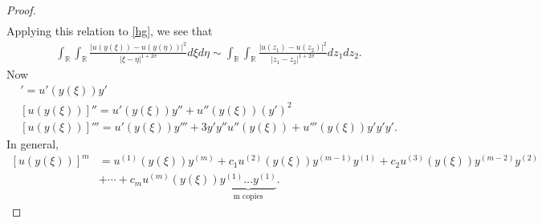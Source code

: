 \documentclass[12pt,reqno]{amsart}
\numberwithin{equation}{section}  %
\numberwithin{figure}{section}
\newcommand{\rr}{\mathbb{R}}
\begin{document}
\begin{proof}
\begin{equation*}
\begin{split}
\end{split}
\end{equation*}
%
%
Applying this relation to \eqref{hg}, we see that
%
%
\begin{equation*}
\begin{split}
\int_{\rr} \int_{\rr} \frac{| u(y(\xi)) - u(y(\eta))
    |^{2}}{| \xi - \eta |^{1 + 2 \sigma}} d \xi d \eta
    \sim 
\int_{\rr} \int_{\rr} \frac{| u(z_{1}) - u(z_{2}) |^{2}}{| z_{1} - z_{2} |^{1 + 2 \sigma}} d z_{1} dz_{2}.
\end{split}
\end{equation*}
%
Now
\begin{gather*}
  [u(y(\xi))]' = u'(y(\xi))y'
  \\
  [u(y(\xi))]'' = u'(y(\xi))y'' + u''(y(\xi))(y')^{2}
  \\
[u(y(\xi))]''' = u'(y(\xi))y''' + 3 y' y'' u''(y(\xi)) + u'''(y(\xi))y'y'y'.
\end{gather*}
In general,
%
%
\begin{equation*}
\begin{split}
  [u(y(\xi))]^{m}
  & = u^{(1)}(y(\xi))y^{(m)} + c_{1} u^{(2)}(y(\xi)) y^{(m-1)}y^{(1)} + c_{2} u^{(3)}(y(\xi)) y^{(m-2)}y^{(2)} 
  \\
  & +\cdots+ c_{m} u^{(m)}(y(\xi)) \underbrace{y^{(1)}\ldots y^{(1)}}_{\text{m copies}}.
\end{split}
\end{equation*}
%
%
%
\end{proof}
%
%
%
%
%
%
\providecommand{\bysame}{\leavevmode\hbox to3em{\hrulefill}\thinspace}
\providecommand{\MR}{\relax\ifhmode\unskip\space\fi MR }
\providecommand{\MRhref}[2]{%
  \href{http://www.ams.org/mathscinet-getitem?mr=#1}{#2}
}
\providecommand{\href}[2]{#2}
\end{document}
